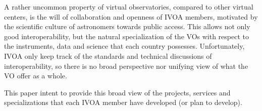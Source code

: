 A rather uncommon property of virtual observatories, compared to other virtual 
centers, is the will of collaboration and openness of IVOA members, motivated by 
the scientific culture of astronomers towards public access. This allows not only good
interoperability, but the natural specialization of the VOs with respect to
the instruments, data and science that each country possesses. 
Unfortunately, IVOA only keep track of the standards and technical discussions
of interoperability, so there is no broad perspective nor unifying view of what
the VO offer as a whole.

This paper intent to provide this broad view of the projects, services and specializations
that each IVOA member have developed (or plan to develop). 





